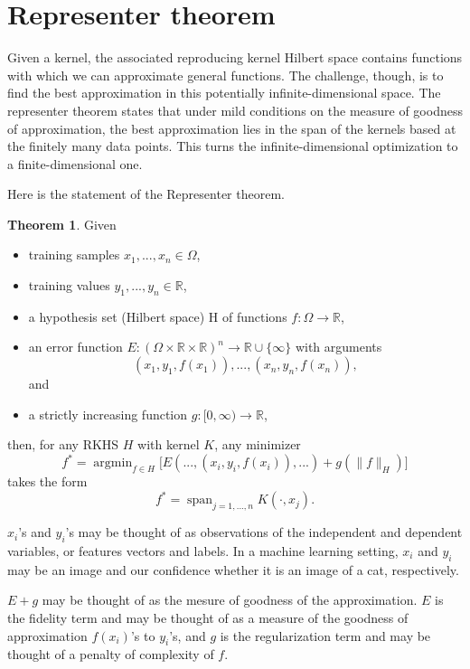 \documentclass{article}
\theoremstyle{definition}
\newtheorem{theorem}{Theorem}[section]
\theoremstyle{remark}
\DeclareMathOperator*{\argmin}{argmin}
\DeclareMathOperator*{\linspan}{span}
\begin{document}
\section{Representer theorem}

Given a kernel, the associated reproducing kernel Hilbert space contains functions with which we can approximate general functions. The challenge, though, is to find the best approximation in this potentially infinite-dimensional space. The representer theorem states that under mild conditions on the measure of goodness of approximation, the best approximation lies in the span of the kernels based at the finitely many data points. This turns the infinite-dimensional optimization to a finite-dimensional one.

Here is the statement of the Representer theorem.

\begin{theorem}
Given 
\begin{itemize}
    \item training samples $x_1, ..., x_n \in \Omega$,
    \item training values $y_1, ..., y_n \in \mathbb{R}$,
    \item a hypothesis set (Hilbert space) H of functions $f: \Omega \to \mathbb{R}$,
    \item an error function $E: (\Omega \times \mathbb{R} \times \mathbb{R})^n \to \mathbb{R} \cup \{\infty\}$ with arguments
    $$(x_1, y_1, f(x_1)), ..., (x_n, y_n, f(x_n)),$$ and
    \item a strictly increasing function $g: [0, \infty) \to \mathbb{R}$,
\end{itemize}
then, for any RKHS $H$ with kernel $K$, any minimizer
$$f^* = \argmin_{f \in H} \big[ E(..., (x_i, y_i, f(x_i)), ...) + g(\|f\|_H) \big]$$
takes the form
$$f^* = \linspan_{j = 1, ..., n} K(\cdot, x_j).$$
\end{theorem}

$x_i$'s and $y_i$'s may be thought of as observations of the independent and dependent variables, or features vectors and labels. In a machine learning setting, $x_i$ and $y_i$ may be an image and our confidence whether it is an image of a cat, respectively.

$E + g$ may be thought of as the mesure of goodness of the approximation. $E$ is the fidelity term and may be thought of as a measure of the goodness of approximation $f(x_i)$'s to $y_i$'s, and $g$ is the regularization term and may be thought of a penalty of complexity of $f$.
\end{document}
